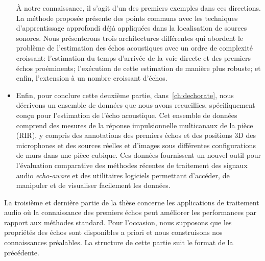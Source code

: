 \begin{itemize}
    À notre connaissance, il s'agit d'un des premiers exemples dans ces directions.
    La méthode proposée présente des points communs avec les techniques d'apprentissage approfondi déjà appliquées dans la localisation de sources sonores.
    Nous présenterons trois architectures différentes qui abordent le problème de l'estimation des échos acoustiques avec un ordre de complexité croissant:
    l'estimation du temps d'arrivée de la voie directe et des premiers échos proéminents;
    l'exécution de cette estimation de manière plus robuste;
    et enfin, l'extension à un nombre croissant d'échos.
    \item
    Enfin, pour conclure cette deuxième partie, dans~\ref{ch:dechorate}, nous décrivons un ensemble de données que nous avons recueillies, spécifiquement conçu pour l'estimation de l'écho acoustique.
    Cet ensemble de données comprend des mesures de la réponse impulsionnelle multicanaux de la pièce (RIR), y compris des annotations des premiers échos et des positions 3D des microphones et des sources réelles et d'images sous différentes configurations de murs dans une pièce cubique.
    Ces données fournissent un nouvel outil pour l'évaluation comparative des méthodes récentes de traitement des signaux audio \textit{echo-aware} et des utilitaires logiciels permettant d'accéder, de manipuler et de visualiser facilement les données.
\end{itemize}

La troisième et dernière partie de la thèse concerne les applications de traitement audio où la connaissance des premiers échos peut améliorer les performances par rapport aux méthodes standard.
Pour l'occasion, nous supposons que les propriétés des échos sont disponibles a priori et nous construisons nos connaissances préalables.
La structure de cette partie suit le format de la précédente.

